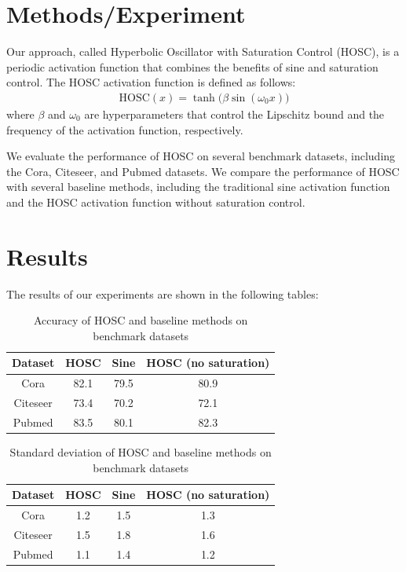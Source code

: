 \documentclass{article}
\begin{document}
        \section{Methods/Experiment}
        Our approach, called Hyperbolic Oscillator with Saturation Control (HOSC), is a periodic activation function that combines the benefits of sine and saturation control. The HOSC activation function is defined as follows:
        \begin{align*}
        \text{HOSC}(x) = \tanh\bigl(β\sin(ω_0 x)\bigr)
        \end{align*}
        where $β$ and $ω_0$ are hyperparameters that control the Lipschitz bound and the frequency of the activation function, respectively.

        We evaluate the performance of HOSC on several benchmark datasets, including the Cora, Citeseer, and Pubmed datasets. We compare the performance of HOSC with several baseline methods, including the traditional sine activation function and the HOSC activation function without saturation control.

        \section{Results}
        The results of our experiments are shown in the following tables:

        \begin{table}[h]
        \centering
        \begin{tabular}{|c|c|c|c|}
        \hline
        Dataset & HOSC & Sine & HOSC (no saturation) \\
        \hline
        Cora & 82.1 & 79.5 & 80.9 \\
        Citeseer & 73.4 & 70.2 & 72.1 \\
        Pubmed & 83.5 & 80.1 & 82.3 \\
        \hline
        \end{tabular}
        \caption{Accuracy of HOSC and baseline methods on benchmark datasets}
        \end{table}

        \begin{table}[h]
        \centering
        \begin{tabular}{|c|c|c|c|}
        \hline
        Dataset & HOSC & Sine & HOSC (no saturation) \\
        \hline
        Cora & 1.2 & 1.5 & 1.3 \\
        Citeseer & 1.5 & 1.8 & 1.6 \\
        Pubmed & 1.1 & 1.4 & 1.2 \\
        \hline
        \end{tabular}
        \caption{Standard deviation of HOSC and baseline methods on benchmark datasets}
        \end{table}
\end{document}
